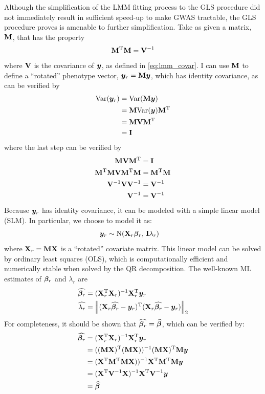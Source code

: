 Although the simplification of the LMM fitting process to the GLS procedure did not immediately result in sufficient speed-up to make GWAS tractable, the GLS procedure proves is amenable to further simplification.
Take as given a matrix, $\mathbf{M}$, that has the property
\begin{align}
	\mathbf{M} ^\mathrm{T} \mathbf{M} = \mathbf{V} ^{-1}
\end{align}
where $\mathbf{V}$ is the covariance of $\bm{y}$, as defined in \cref{eq:lmm_covar}.
I can use $\mathbf{M}$ to define a ``rotated'' phenotype vector, $\bm{y}_r = \mathbf{M} \bm{y}$, which has identity covariance, as can be verified by
\begin{align}
\text{Var}(\bm{y}_r) &= \text{Var}(\mathbf{M} \bm{y}) \\
            &= \mathbf{M} \text{Var}(\bm{y}) \mathbf{M} ^\mathrm{T}\\
            &= \mathbf{M} \mathbf{V} \mathbf{M} ^\mathrm{T} \\
            &= \mathbf{I}
\end{align}
where the last step can be verified by
\begin{align}
  \mathbf{M} \mathbf{V} \mathbf{M} ^\mathrm{T}            &= \mathbf{I}\\
  \mathbf{M} ^\mathrm{T} \mathbf{M} \mathbf{V} \mathbf{M} ^\mathrm{T} \mathbf{M} &= \mathbf{M} ^\mathrm{T} \mathbf{M} \\
  \mathbf{V} ^{-1} \mathbf{V} \mathbf{V} ^{-1}     &= \mathbf{V} ^{-1}\\
  \mathbf{V} ^{-1}                  &= \mathbf{V} ^{-1}
\end{align}
Because $\bm{y}_r$ has identity covariance, it can be modeled with a simple linear model (SLM).
In particular, we choose to model it as:
\begin{align}
    \bm{y}_r &\sim \mathrm{N}(\mathbf{X}_r \boldsymbol{\beta}_r, \, \mathbf{I} \lambda_r) \label{eq:ols}
\end{align}
where $\mathbf{X}_r = \mathbf{M} \mathbf{X}$ is a ``rotated'' covariate matrix.
This linear model can be solved by ordinary least squares (OLS), which is computationally efficient and numerically stable when solved by the QR decomposition.
The well-known ML estimates of $\boldsymbol{\beta}_r$ and $\lambda_r$ are
\begin{align}
    \widehat{\boldsymbol{\beta}_r}    &= (\mathbf{X}_r ^\mathrm{T} \mathbf{X}_r) ^{-1} \mathbf{X}_r ^\mathrm{T} \bm{y}_r\\
    \widehat{\lambda_r}   &= \left\lVert(\mathbf{X}_r \widehat{\boldsymbol{\beta}_r} - \bm{y}_r)^\mathrm{T}(\mathbf{X}_r \widehat{\boldsymbol{\beta}_r} - \bm{y}_r)\right\rVert_{2}
\end{align}
For completeness, it should be shown that $\widehat{\boldsymbol{\beta}_r} = \widehat{\boldsymbol{\beta}}$, which can be verified by:
\begin{align}
  \widehat{\boldsymbol{\beta}_r}    &= (\mathbf{X}_r ^\mathrm{T} \mathbf{X}_r) ^{-1} \mathbf{X}_r ^\mathrm{T} \bm{y}_r\\
                        &= ((\mathbf{M} \mathbf{X})^\mathrm{T} (\mathbf{M} \mathbf{X})) ^{-1} (\mathbf{M} \mathbf{X})^\mathrm{T} \mathbf{M} \bm{y}\\
                        &= (\mathbf{X}^\mathrm{T} \mathbf{M}^\mathrm{T} \mathbf{M} \mathbf{X}))^{-1} \mathbf{X}^\mathrm{T} \mathbf{M}^\mathrm{T} \mathbf{M} \bm{y}\\
                        &= (\mathbf{X}^\mathrm{T} \mathbf{V}^{-1} \mathbf{X})^{-1} \mathbf{X}^\mathrm{T} \mathbf{V}^{-1} \bm{y}\\
                        &= \widehat{\boldsymbol{\beta}}
\end{align}
